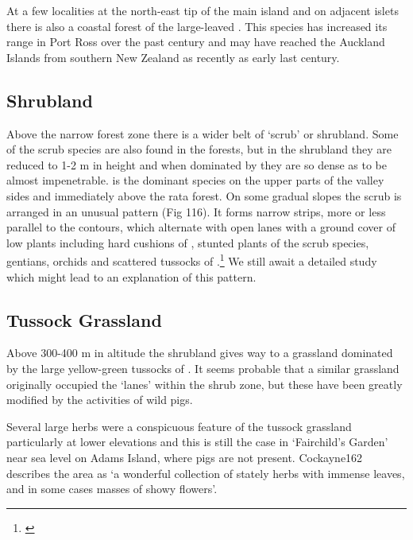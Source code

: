 At a few localities at the north-east tip of the main island and on adjacent islets there is also a coastal forest of the large-leaved .
This species has increased its range in Port Ross over the past century and may have reached the Auckland Islands from southern New Zealand as recently as early last century.

\subsection{Shrubland}

Above the narrow forest zone there is a wider belt of `scrub' or shrubland.
Some of the scrub species are also found in the forests, but in the shrubland they are reduced to 1-2 m in height and when dominated by  they are so dense as to be almost impenetrable.  is the dominant species on the upper parts of the valley sides and  immediately above the rata forest.
On some gradual slopes the scrub is arranged in an unusual pattern (Fig 116).
It forms narrow strips, more or less parallel to the contours, which alternate with open lanes with a ground cover of low plants including hard cushions of , stunted plants of the scrub species, gentians, orchids and scattered tussocks of .\footnote{\cite{godley1965notes}}
We still await a detailed study which might lead to an explanation of this pattern.

\subsection{Tussock Grassland}

Above 300-400 m in altitude the shrubland gives way to a grassland dominated by the large yellow-green tussocks of .
It seems probable that a similar grassland originally occupied the `lanes' within the shrub zone, but these have been greatly modified by the activities of wild pigs.

Several large herbs were a conspicuous feature of the tussock grassland particularly at lower elevations and this is still the case in `Fairchild's Garden' near sea level on Adams Island, where pigs are not present.
Cockayne162 describes the area as `a wonderful collection of stately herbs with immense leaves, and in some cases masses of showy flowers'.

